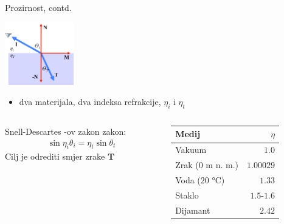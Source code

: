 \documentclass[9pt]{beamer}
\begin{document}
\begin{frame}{Prozirnost, contd.}

\begin{center}
\includegraphics[width=3cm]{slike/prozirnost_02.png}
\end{center}
\begin{itemize}
\item dva materijala, dva indeksa refrakcije, $\eta_i$ i $\eta_t$
\end{itemize}
\begin{columns}
	\begin{column}{0.5\textwidth}
		Snell-Descartes -ov zakon zakon:
		\begin{align*}
		\sin \eta_i \theta_i = \eta_t \sin\theta_t%
		\end{align*}
		Cilj je odrediti smjer zrake $\mathbf{T}$
	\end{column}
	\begin{column}{0.5\textwidth}
		\begin{center}
			\begin{tabular}{ l r } 
				\textbf{Medij} & $\eta$ \\
				\hline
				Vakuum & $1.0$  \\ 
				Zrak ($0$ m n. m.) & $1.00029$  \\ 
				Voda ($20$ °C) & $1.33$  \\ 
				Staklo & $1.5$-$1.6$  \\ 
				Dijamant & $2.42$  \\ 
				\hline
			\end{tabular}
		\end{center}
	\end{column}
\end{columns}

\end{frame}
\end{document}

